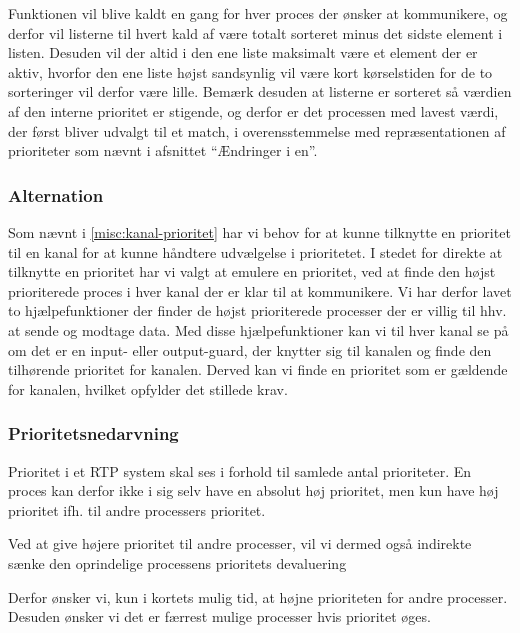 Funktionen  vil blive kaldt en gang for hver proces der ønsker at kommunikere, og derfor vil listerne til hvert kald af  være totalt sorteret minus det sidste element i listen. Desuden vil der altid i den ene liste maksimalt være et element der er aktiv, hvorfor den ene liste højst sandsynlig vil være kort kørselstiden for de to sorteringer vil derfor være lille. Bemærk desuden at listerne er sorteret så værdien af den interne prioritet er stigende, og derfor er det processen med lavest værdi, der først bliver udvalgt til et match, i overensstemmelse med repræsentationen af prioriteter som nævnt i afsnittet ``Ændringer i \sched en''.

\subsubsection*{Alternation}
Som nævnt i \cref{misc:kanal-prioritet} har vi behov for at kunne tilknytte en prioritet til en kanal for at kunne håndtere udvælgelse i  prioritetet. I stedet for direkte at tilknytte en prioritet har vi valgt at emulere en prioritet, ved at finde den højst prioriterede proces i hver kanal der er klar til at kommunikere.  Vi har derfor lavet to hjælpefunktioner der finder de højst prioriterede processer der er villig til hhv. at sende og modtage data. Med disse hjælpefunktioner kan vi til hver kanal se på om det er en input- eller output-guard, der knytter sig til kanalen og finde den tilhørende prioritet for kanalen. Derved kan vi finde en prioritet som er gældende for kanalen, hvilket opfylder det stillede krav. 



\subsubsection*{Prioritetsnedarvning}
Prioritet i et RTP system skal ses i forhold til samlede antal prioriteter. En proces kan derfor ikke i sig selv have en absolut høj prioritet, men kun have høj prioritet ifh. til andre processers prioritet. 

Ved at give højere prioritet til andre processer, vil vi dermed også indirekte sænke den oprindelige processens prioritets devaluering

Derfor ønsker vi, kun i kortets mulig tid, at højne prioriteten for andre processer. Desuden ønsker vi det er færrest mulige processer hvis prioritet øges. 

